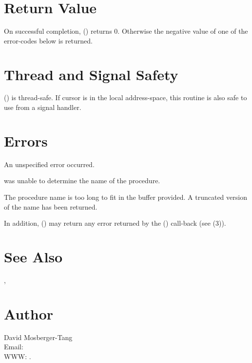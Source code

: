 \documentclass{article}
\begin{document}
\section{Return Value}

On successful completion, () returns 0.
Otherwise the negative value of one of the error-codes below is
returned.

\section{Thread and Signal Safety}

() is thread-safe.  If cursor  is
in the local address-space, this routine is also safe to use from a
signal handler.

\section{Errors}

\begin{Description}
\item[\Const{UNW\_EUNSPEC}] An unspecified error occurred.
\item[\Const{UNW\_ENOINFO}]  was unable to determine
  the name of the procedure.
\item[\Const{UNW\_ENOMME}] The procedure name is too long to fit
  in the buffer provided.  A truncated version of the name has been
  returned.
\end{Description}
In addition, () may return any error
returned by the () call-back (see
(3)).

\section{See Also}

,

\section{Author}

\noindent
David Mosberger-Tang\\
Email: \\
WWW: .
\LatexManEnd
\end{document}
